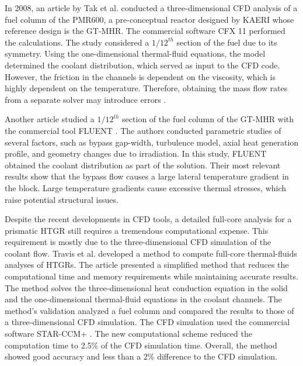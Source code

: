 In 2008, an article by Tak et al. \cite{tak_numerical_2008} conducted a three-dimensional CFD analysis of a fuel column of the PMR600, a pre-conceptual reactor designed by \gls{KAERI} whose reference design is the GT-MHR.
The commercial software CFX 11 \cite{ansys_incorporated_cfx_2006} performed the calculations.
The study considered a $1/12^{th}$ section of the fuel due to its symmetry.
Using the one-dimensional thermal-fluid equations, the model determined the coolant distribution, which served as input to the CFD code.
However, the friction in the channels is dependent on the viscosity, which is highly dependent on the temperature.
Therefore, obtaining the mass flow rates from a separate solver may introduce errors \cite{sato_computational_2010}.

Another article \cite{sato_computational_2010} studied a $1/12^{th}$ section of the fuel column of the GT-MHR with the commercial tool FLUENT \cite{fluent_inc_fluent_2006}.
The authors conducted parametric studies of several factors, such as bypass gap-width, turbulence model, axial heat generation profile, and geometry changes due to irradiation.
In this study, FLUENT obtained the coolant distribution as part of the solution.
Their most relevant results show that the bypass flow causes a large lateral temperature gradient in the block.
Large temperature gradients cause excessive thermal stresses, which raise potential structural issues.

Despite the recent developments in CFD tools, a detailed full-core analysis for a prismatic \gls{HTGR} still requires a tremendous computational expense.
This requirement is mostly due to the three-dimensional CFD simulation of the coolant flow.
Travis et al. \cite{travis_thermalhydraulics_2013} developed a method to compute full-core thermal-fluids analyses of HTGRs.
The article presented a simplified method that reduces the computational time and memory requirements while maintaining accurate results.
The method solves the three-dimensional heat conduction equation in the solid and the one-dimensional thermal-fluid equations in the coolant channels.
The method's validation analyzed a fuel column and compared the results to those of a three-dimensional CFD simulation.
The CFD simulation used the commercial software STAR-CCM+ \cite{cd-adapco_star-ccm_2012}.
The new computational scheme reduced the computation time to 2.5\% of the CFD simulation time.
Overall, the method showed good accuracy and less than a 2\% difference to the CFD simulation.

